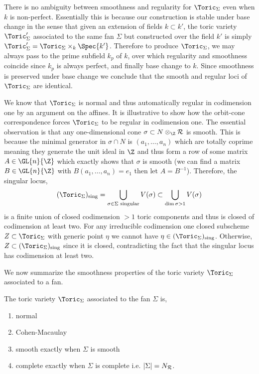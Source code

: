 \begin{rmk}
There is no ambiguity between smoothness and regularity for $\Toric_\Sigma$ even when $k$ is non-perfect. Essentially this is because our construction is stable under base change in the sense that given an extension of fields $k \subset k'$, the toric variety $\Toric_\Sigma'$ associated to the same fan $\Sigma$ but constructed over the field $k'$ is simply $\Toric_\Sigma' = \Toric_\Sigma \times_{k} \Spec{k'}$. Therefore to produce $\Toric_{\Sigma}$, we may always pass to the prime subfield $k_p$ of $k$, over which regularity and smoothness coincide since $k_p$ is always perfect, and finally base change to $k$. Since smoothness is preserved under base change we conclude that the smooth and regular loci of $\Toric_\Sigma$ are identical. 
\end{rmk}

\begin{rmk}
We know that $\Toric_\Sigma$ is normal and thus automatically regular in codimension one by an argument on the affines. It is illustrative to show how the orbit-cone correspondence forces $\Toric_\Sigma$ to be regular in codimension one. The essential observation is that any one-dimensional cone $\sigma \subset N \otimes_\Z \R$ is smooth. This is because the minimal generator in $\sigma \cap N$ is $(a_1, \dots, a_n)$ which are totally coprime meaning they generate the unit ideal in $\Z$ and thus form a row of some matrix $A \in \GL{n}{\Z}$ which exactly shows that $\sigma$ is smooth (we can find a matrix $B \in \GL{n}{\Z}$ with $B (a_1, \dots, a_n) = e_1$ then let $A = B^{-1}$). Therefore, the singular locus,
\[ (\Toric_\Sigma)_{\text{sing}} = \bigcup_{\sigma \in \Sigma \text{ singular}} V(\sigma) \subset \bigcup_{\dim{\sigma} > 1} V(\sigma) \]
is a finite union of closed codimension $>1$ toric components and thus is closed of codimension at least two. For any irreducible codimension one closed subscheme $Z \subset \Toric_\Sigma$ with generic point $\eta$ we cannot have $\eta \in (\Toric_\Sigma)_{\text{sing}}$. Otherwise, $Z \subset (\Toric_\Sigma)_{\text{sing}}$ since it is closed, contradicting the fact that the singular locus has codimension at least two.
\end{rmk}
\noindent
We now summarize the smoothness properties of the toric variety $\Toric_\Sigma$ associated to a fan.

\begin{theorem}
The toric variety $\Toric_\Sigma$ associated to the fan $\Sigma$   is,
\begin{enumerate}
\item normal
\item Cohen-Macaulay
\item smooth exactly when $\Sigma$ is smooth
\item complete exactly when $\Sigma$ is complete i.e. $|\Sigma| = N_{\mathcal{R}}$. 
\end{enumerate}
\end{theorem}

